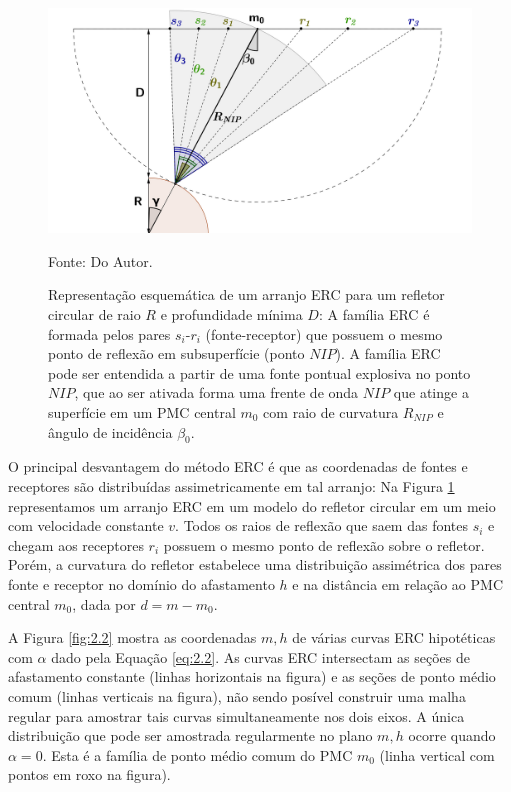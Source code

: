 \begin{figure}[H]
\caption{Representação esquemática de um arranjo ERC para um refletor circular de raio $R$ e profundidade
mínima $D$: A família ERC é formada pelos pares $s_i$-$r_i$ (fonte-receptor) que possuem o mesmo ponto de
reflexão em subsuperfície (ponto $NIP$). A família ERC pode ser entendida a partir de uma fonte pontual explosiva
no ponto $NIP$, que ao ser ativada forma uma frente de onda $NIP$ que atinge a superfície em um PMC central 
$m_0$ com raio de curvatura $R_{NIP}$ e ângulo de incidência $\beta_0$.}
\begin{center}
\includegraphics[scale=0.3]{images/cre.png}
\vspace{-0.3cm}
\end{center}
\begin{center}
 Fonte: Do Autor.
\end{center}
\label{fig:2.1}
\end{figure}

O principal desvantagem do método ERC é que as coordenadas de fontes e receptores são distribuídas assimetricamente em tal 
arranjo: Na Figura \ref{fig:2.1} representamos um arranjo ERC em um modelo do refletor circular 
em um meio com velocidade constante $v$.
Todos os raios de reflexão que saem das fontes $s_i$ e chegam aos receptores $r_i$ 
possuem o mesmo ponto de reflexão sobre o refletor.
Porém, a curvatura do refletor estabelece uma distribuição assimétrica dos pares fonte e receptor no domínio do afastamento $h$
e na distância em relação ao PMC central $m_0$, dada por $d=m-m_0$.

A Figura \ref{fig:2.2} mostra as coordenadas $m, h$ de várias curvas ERC hipotéticas com $\alpha$ dado pela Equação \ref{eq:2.2}.
As curvas ERC intersectam as seções de afastamento constante (linhas horizontais na figura) e as seções de ponto médio comum 
(linhas verticais na figura), não sendo posível construir uma malha regular para amostrar tais curvas simultaneamente nos dois
eixos.
A única distribuição que pode ser amostrada regularmente no plano $m, h$ ocorre quando $\alpha=0$. Esta é
a família de ponto médio comum do PMC $m_0$ (linha vertical com pontos em roxo na figura).

